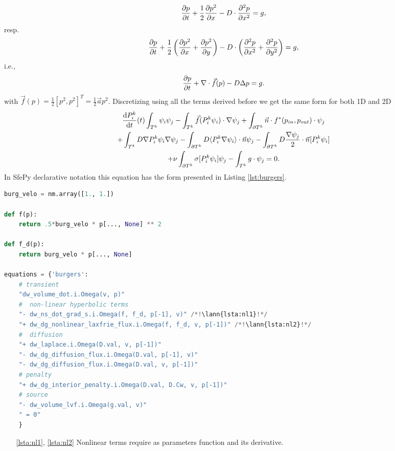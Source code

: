 \begin{equation}
\frac{\partial p}{\partial t} + \frac{1}{2}\frac{\partial p^2}{\partial x} - D \cdot\frac{\partial^2 p}{\partial x^2} = g,
\end{equation}
resp.
\begin{equation}
\label{eq:ex_burgers}
    \frac{\partial p}{\partial t} + \frac{1}{2}\left(\frac{\partial p^2}{\partial x} + \frac{\partial p^2}{\partial y}\right)  - 
    D \cdot \left( \frac{\partial^2 p}{\partial x^2} + \frac{\partial^2 p}{\partial y^2} \right) 
    = g,
\end{equation}
i.e.,
\begin{equation}
    \frac{\partial p}{\partial t} + \nabla \cdot \vec{f}(p) - D\Delta p = g.
\end{equation}
with $\vec{f}(p) = \frac{1}{2}[p^2, p^2]^T = \frac{1}{2}\vec{a} p^2$.
Discretizing using all the terms derived before we get the same form for both 1D and 2D
\begin{multline}
    \frac{\text{d}P^k_i}{\text{d}t}(t)\int_{T^k}\psi_i\psi_j 
    - \int_{T^k} \vec{f}(P_i^k\psi_i)\cdot\nabla\psi_j 
    + \int_{\partial{T^k}} \vec{n} \cdot f^{*} (p_{in}, p_{out})\cdot\psi_j\\
    + \int_{T^k} D\nabla P^k_i\psi_i \nabla \psi_j
    - \int_{\partial T^k} D \langle P^k_i\nabla\psi_i\rangle \cdot \vec{n}\psi_j
    - \int_{\partial T^k} D \frac{\nabla \psi_j}{2}\cdot \vec{n} [P^k_i\psi_i] \\
    + \nu \int_{\partial T^k} \sigma [P^k_i\psi_i]\psi_j
    - \int_{T^k} g\cdot \psi_j
    = 0.
\end{multline}
In SfePy declarative notation this equation has the form presented in 
Listing \ref{lst:burgers}.
\setcounter{lstannotation}{0}
\begin{lstlisting}[language=Python, caption=Viscous Burgers equation \label{lst:burgers}]
burg_velo = nm.array([1., 1.])

def f(p):
    return .5*burg_velo * p[..., None] ** 2

def f_d(p):
    return burg_velo * p[..., None]

equations = {'burgers':
    # transient
    "dw_volume_dot.i.Omega(v, p)"
    #  non-linear hyperbolic terms
    "- dw_ns_dot_grad_s.i.Omega(f, f_d, p[-1], v)" /*!\lann{lsta:nl1}!*/
    "+ dw_dg_nonlinear_laxfrie_flux.i.Omega(f, f_d, v, p[-1])" /*!\lann{lsta:nl2}!*/
    #  diffusion
    "+ dw_laplace.i.Omega(D.val, v, p[-1])"
    "- dw_dg_diffusion_flux.i.Omega(D.val, p[-1], v)"
    "- dw_dg_diffusion_flux.i.Omega(D.val, v, p[-1])"
    # penalty
    "+ dw_dg_interior_penalty.i.Omega(D.val, D.Cw, v, p[-1])"
    # source
    "- dw_volume_lvf.i.Omega(g.val, v)"
    " = 0"
    }
\end{lstlisting}
\begin{itemize}
    \item[\ref{lsta:nl1}, \ref{lsta:nl2}] Nonlinear terms require as parameters function 
    and its derivative.
\end{itemize}


